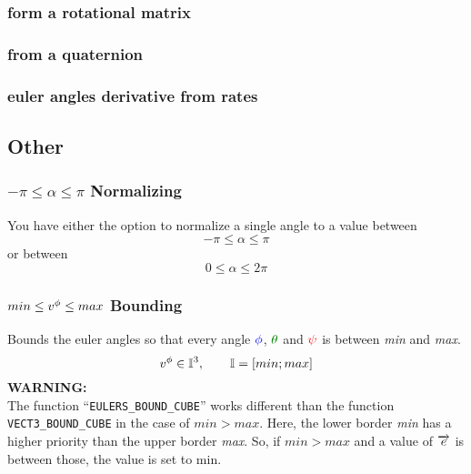 \subsubsection*{form a rotational matrix}


\subsubsection*{from a quaternion}


\subsubsection*{euler angles derivative from rates}




\subsection{Other}
\subsubsection*{$-\pi \leq \alpha \leq \pi$ Normalizing}
You have either the option to normalize a single angle to a value between
\begin{equation}
-\pi \leq \alpha \leq \pi
\end{equation}
or between 
\begin{equation}
0 \leq \alpha \leq 2\pi
\end{equation}


\subsubsection*{$min \leq v^{\phi} \leq max$ Bounding}
Bounds the euler angles so that every angle $\Roll$, $\Pitch$ and $\Yaw$ is between \textit{min} and \textit{max}.
\begin{equation}
v^{\phi} \in \mathbb{I}^3, \qquad \mathbb{I} = [min; max]
\end{equation}
\textbf{WARNING:}\\
The function  ``\texttt{EULERS\_BOUND\_CUBE}'' works different than the function \texttt{VECT3\_BOUND\_CUBE} in the case of $min > max$. Here, the lower border \textit{min} has a higher priority than the upper border \textit{max}. So, if $ min > max$ and a value of $ \overrightarrow{e} $ is between those, the value is set to min. \\
